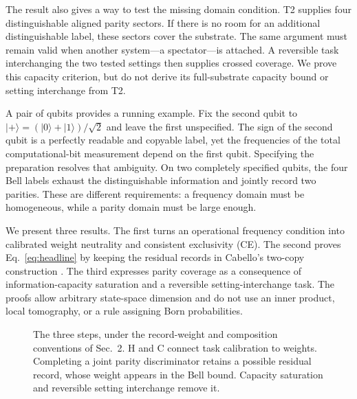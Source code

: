 \documentclass[a4paper,11pt,twocolumn,unpublished]{quantumarticle}
\let\label\QuantumKernelLabel
\newcommand{\ket}[1]{\lvert #1\rangle}
\newcommand{\eps}{\varepsilon}
\begin{document}
The result also gives a way to test the missing domain condition. T2 supplies four distinguishable aligned parity sectors. If there is no room for an additional distinguishable label, these sectors cover the substrate. The same argument must remain valid when another system---a spectator---is attached. A reversible task interchanging the two tested settings then supplies crossed coverage. We prove this capacity criterion, but do not derive its full-substrate capacity bound or setting interchange from T2.

A pair of qubits provides a running example. Fix the second qubit to $\ket+ = (\ket0+\ket1)/\sqrt2$ and leave the first unspecified. The sign of the second qubit is a perfectly readable and copyable label, yet the frequencies of the total computational-bit measurement depend on the first qubit. Specifying the preparation resolves that ambiguity. On two completely specified qubits, the four Bell labels exhaust the distinguishable information and jointly record two parities. These are different requirements: a frequency domain must be homogeneous, while a parity domain must be large enough.

We present three results. The first turns an operational frequency condition into calibrated weight neutrality and consistent exclusivity (CE). The second proves Eq.~\eqref{eq:headline} by keeping the residual records in Cabello's two-copy construction \cite{cabello}. The third expresses parity coverage as a consequence of information-capacity saturation and a reversible setting-interchange task. The proofs allow arbitrary state-space dimension and do not use an inner product, local tomography, or a rule assigning Born probabilities.

\begin{figure}[!htbp]
\centering
{}
\caption{The three steps, under the record-weight and composition conventions of Sec.~2. H and C connect task calibration to weights. Completing a joint parity discriminator retains a possible residual record, whose weight appears in the Bell bound. Capacity saturation and reversible setting interchange remove it.}
\label{fig:logic}
\end{figure}
\end{document}
